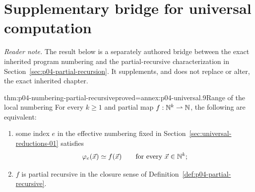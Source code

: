 
\section*{Supplementary bridge for universal computation}
\noindent\textit{Reader note.}
The result below is a separately authored bridge between the exact inherited
program numbering and the partial-recursive characterization in
Section~\ref{sec:p04-partial-recursion}.  It supplements, and does not replace
or alter, the exact inherited chapter.

\begin{hbcorollary}{thm:p04-numbering-partial-recursive}{proved=annex:p04-universal.9}{Range of the local numbering}
For every \(k\geq1\) and partial map \(f:\mathbb{N}^k\rightharpoonup\mathbb{N}\), the
following are equivalent:
\begin{enumerate}
  \item some index \(e\) in the effective numbering fixed in
        Section~\ref{sec:universal-reductions-01} satisfies
        \[
          \varphi_e(\vec x)\simeq f(\vec x)
          \qquad\text{for every }\vec x\in\mathbb{N}^k;
        \]
  \item \(f\) is partial recursive in the closure sense of
        Definition~\ref{def:p04-partial-recursive}.
\end{enumerate}
\end{hbcorollary}
